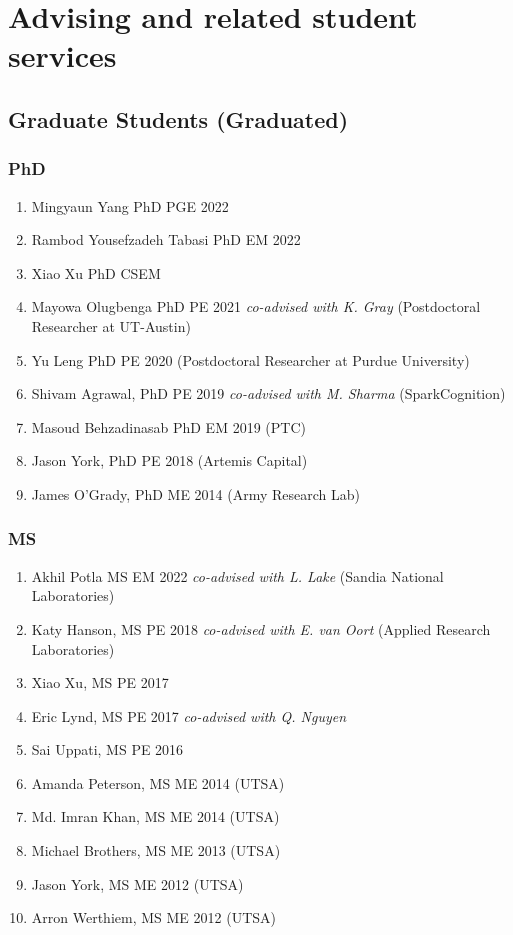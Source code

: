 \section*{Advising and related student services}

\subsection*{Graduate Students (Graduated)}

\subsubsection*{PhD}
\begin{enumerate}
    \item Mingyaun Yang PhD PGE 2022
    \item Rambod Yousefzadeh Tabasi PhD EM 2022
    \item Xiao Xu PhD CSEM
    \item Mayowa Olugbenga PhD PE 2021 \emph{co-advised with K. Gray} (Postdoctoral Researcher at UT-Austin)
    \item Yu Leng PhD PE 2020 (Postdoctoral Researcher at Purdue University)
    \item Shivam Agrawal, PhD PE 2019 \emph{co-advised with M. Sharma} (SparkCognition)
    \item Masoud Behzadinasab PhD EM 2019 (PTC)
    \item Jason York, PhD PE 2018 (Artemis Capital) 
    \item James O'Grady, PhD ME 2014 (Army Research Lab)
\end{enumerate}

\subsubsection*{MS}
\begin{enumerate}
    \item Akhil Potla MS EM 2022 \emph{co-advised with L. Lake} (Sandia National Laboratories)
    \item Katy Hanson, MS PE 2018 \emph{co-advised with E. van Oort} (Applied Research Laboratories)
    \item Xiao Xu, MS PE 2017
    \item Eric Lynd, MS PE 2017  \emph{co-advised with Q. Nguyen}
    \item Sai Uppati, MS PE 2016
    \item Amanda Peterson, MS ME 2014 (UTSA)
    \item Md. Imran Khan, MS ME 2014 (UTSA)
    \item Michael Brothers, MS ME 2013 (UTSA)
    \item Jason York, MS ME 2012 (UTSA)
    \item Arron Werthiem, MS ME 2012 (UTSA)
\end{enumerate}

